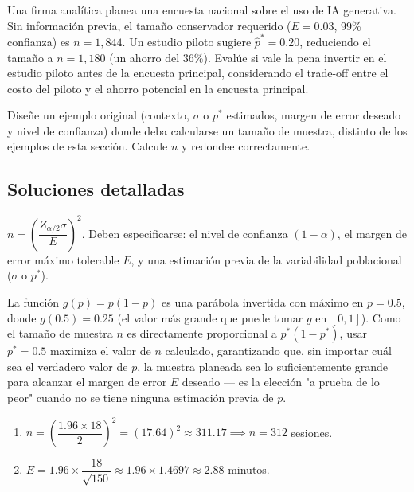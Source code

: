 \begin{problema}
	\label{prob:d79f0c1}
	Una firma analítica planea una encuesta nacional sobre el uso de IA generativa. Sin información previa, el tamaño conservador requerido ($E=0.03$, 99\% confianza) es $n=1{,}844$. Un estudio piloto sugiere $\hat p^*=0.20$, reduciendo el tamaño a $n=1{,}180$ (un ahorro del $36\%$). Evalúe si vale la pena invertir en el estudio piloto antes de la encuesta principal, considerando el trade-off entre el costo del piloto y el ahorro potencial en la encuesta principal.
\end{problema}

\begin{problema}
	\label{prob:a691b8d}
	Diseñe un ejemplo original (contexto, $\sigma$ o $p^*$ estimados, margen de error deseado y nivel de confianza) donde deba calcularse un tamaño de muestra, distinto de los ejemplos de esta sección. Calcule $n$ y redondee correctamente.
\end{problema}

\subsection*{Soluciones detalladas}

\begin{solproblema}[prob:01c5fc7]
	$n = \left(\dfrac{Z_{\alpha/2}\sigma}{E}\right)^2$. Deben especificarse: el nivel de confianza $(1-\alpha)$, el margen de error máximo tolerable $E$, y una estimación previa de la variabilidad poblacional ($\sigma$ o $p^*$).
\end{solproblema}

\begin{solproblema}[prob:f82cc83]
	La función $g(p)=p(1-p)$ es una parábola invertida con máximo en $p=0.5$, donde $g(0.5)=0.25$ (el valor más grande que puede tomar $g$ en $[0,1]$). Como el tamaño de muestra $n$ es directamente proporcional a $p^*(1-p^*)$, usar $p^*=0.5$ maximiza el valor de $n$ calculado, garantizando que, sin importar cuál sea el verdadero valor de $p$, la muestra planeada sea lo suficientemente grande para alcanzar el margen de error $E$ deseado — es la elección "a prueba de lo peor" cuando no se tiene ninguna estimación previa de $p$.
\end{solproblema}

\begin{solproblema}[prob:f57d73c]
	\begin{enumerate}
		\item $n = \left(\dfrac{1.96\times18}{2}\right)^2 = (17.64)^2 \approx311.17 \implies n=312$ sesiones.
		\item $E = 1.96\times\dfrac{18}{\sqrt{150}} \approx1.96\times1.4697\approx2.88$ minutos.
	\end{enumerate}
\end{solproblema}

